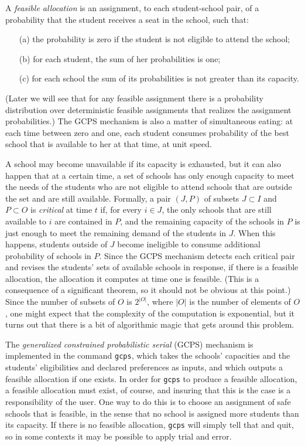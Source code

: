 \documentclass[12pt]{article}
\theoremstyle{definition}
\begin{document}
A \emph{feasible allocation} is an assignment, to each student-school
pair, of a probability that the student receives a seat in the school,
such that:
\begin{enumerate}
  \item[(a)] the probability is zero if the student is not eligible to
    attend the school;
  \item[(b)] for each student, the sum of her probabilities is one;
  \item[(c)] for each school the sum of its probabilities is not
    greater than its capacity.
\end{enumerate}
(Later we will see that for any feasible assignment there is a
probability distribution over deterministic feasible assignments that
realizes the assignment probabilities.)  The GCPS mechanism is also a
matter of simultaneous eating: at each time between zero and one, each
student consumes probability of the best school that is available to
her at that time, at unit speed.

A school may become unavailable if its capacity is exhausted, but it
can also happen that at a certain time, a set of schools has only
enough capacity to meet the needs of the students who are not eligible
to attend schools that are outside the set and are still available.
Formally, a pair $(J,P)$ of subsets $J \subset I$ and $P \subset O$ is
\emph{critical} at time $t$ if, for every $i \in J$, the only schools
that are still available to $i$ are contained in $P$, and the
remaining capacity of the schools in $P$ is just enough to meet the
remaining demand of the students in $J$.  When this happens, students
outside of $J$ become ineligible to consume additional probability of
schools in $P$.  Since the GCPS mechanism detects each critical pair
and revises the students' sets of available schools in response, if
there is a feasible allocation, the allocation it computes at time one
is feasible.  (This is a consequence of a significant theorem, so it
should not be obvious at this point.)  Since the number of subsets of
$O$ is $2^{|O|}$, where $|O|$ is the number of elements of $O$, one
might expect that the complexity of the computation is exponential,
but it turns out that there is a bit of algorithmic magic that gets
around this problem.

The \emph{generalized constrained probabilistic serial} (GCPS)
mechanism is implemented in the command \texttt{gcps}, which takes the
schools' capacities and the students' eligibilities and declared
preferences as inputs, and which outputs a feasible allocation if one
exists.  In order for \texttt{gcps} to produce a feasible allocation,
a feasible allocation must exist, of course, and insuring that this is
the case is a responsibility of the user.  One way to do this is to
choose an assignment of safe schools that is feasible, in the sense
that no school is assigned more students than its capacity.  If there
is no feasible allocation, \texttt{gcps} will simply tell that and
quit, so in some contexts it may be possible to apply trial and error.
\end{document}
